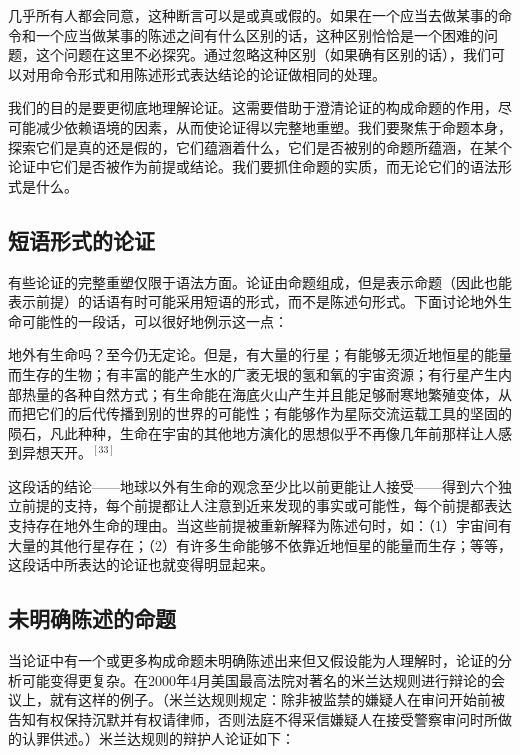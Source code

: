 几乎所有人都会同意，这种断言可以是或真或假的。如果在一个应当去做某事的命令和一个应当做某事的陈述之间有什么区别的话，这种区别恰恰是一个困难的问题，这个问题在这里不必探究。通过忽略这种区别（如果确有区别的话），我们可以对用命令形式和用陈述形式表达结论的论证做相同的处理。

我们的目的是要更彻底地理解论证。这需要借助于澄清论证的构成命题的作用，尽可能减少依赖语境的因素，从而使论证得以完整地重塑。我们要聚焦于命题本身，探索它们是真的还是假的，它们蕴涵着什么，它们是否被别的命题所蕴涵，在某个论证中它们是否被作为前提或结论。我们要抓住命题的实质，而无论它们的语法形式是什么。

\subsection{短语形式的论证}

有些论证的完整重塑仅限于语法方面。论证由命题组成，但是表示命题（因此也能表示前提）的话语有时可能采用短语的形式，而不是陈述句形式。下面讨论地外生命可能性的一段话，可以很好地例示这一点：

\begin{displayquote}
地外有生命吗？至今仍无定论。但是，有大量的行星；有能够无须近地恒星的能量而生存的生物；有丰富的能产生水的广袤无垠的氢和氧的宇宙资源；有行星产生内部热量的各种自然方式；有生命能在海底火山产生并且能足够耐寒地繁殖变体，从而把它们的后代传播到别的世界的可能性；有能够作为星际交流运载工具的坚固的陨石，凡此种种，生命在宇宙的其他地方演化的思想似乎不再像几年前那样让人感到异想天开。${}^{[33]}$
\end{displayquote}

这段话的结论——地球以外有生命的观念至少比以前更能让人接受——得到六个独立前提的支持，每个前提都让人注意到近来发现的事实或可能性，每个前提都表达支持存在地外生命的理由。当这些前提被重新解释为陈述句时，如：（1）宇宙间有大量的其他行星存在；（2）有许多生命能够不依靠近地恒星的能量而生存；等等，这段话中所表达的论证也就变得明显起来。

\subsection{未明确陈述的命题}

当论证中有一个或更多构成命题未明确陈述出来但又假设能为人理解时，论证的分析可能变得更复杂。在2000年4月美国最高法院对著名的米兰达规则进行辩论的会议上，就有这样的例子。（米兰达规则规定：除非被监禁的嫌疑人在审问开始前被告知有权保持沉默并有权请律师，否则法庭不得采信嫌疑人在接受警察审问时所做的认罪供述。）米兰达规则的辩护人论证如下：


